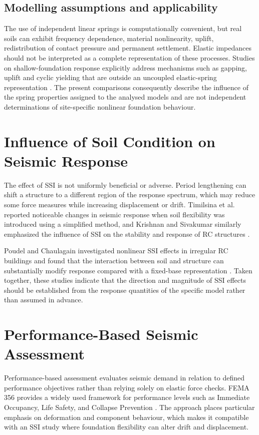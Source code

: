 \subsection*{Modelling assumptions and applicability}
The use of independent linear springs is computationally convenient, but real soils can exhibit frequency dependence, material nonlinearity, uplift, redistribution of contact pressure and permanent settlement. Elastic impedances should not be interpreted as a complete representation of these processes. Studies on shallow-foundation response explicitly address mechanisms such as gapping, uplift and cyclic yielding that are outside an uncoupled elastic-spring representation \cite{gajan2008,raychowdhury2008}. The present comparisons consequently describe the influence of the spring properties assigned to the analysed models and are not independent determinations of site-specific nonlinear foundation behaviour.

\section{Influence of Soil Condition on Seismic Response}
The effect of SSI is not uniformly beneficial or adverse. Period lengthening can shift a structure to a different region of the response spectrum, which may reduce some force measures while increasing displacement or drift. Timilsina et al. reported noticeable changes in seismic response when soil flexibility was introduced using a simplified method, and Krishnan and Sivakumar similarly emphasized the influence of SSI on the stability and response of RC structures \cite{timilsina2023,krishnan2024}.

Poudel and Chaulagain investigated nonlinear SSI effects in irregular RC buildings and found that the interaction between soil and structure can substantially modify response compared with a fixed-base representation \cite{poudel2024}. Taken together, these studies indicate that the direction and magnitude of SSI effects should be established from the response quantities of the specific model rather than assumed in advance.

\section{Performance-Based Seismic Assessment}
Performance-based assessment evaluates seismic demand in relation to defined performance objectives rather than relying solely on elastic force checks. FEMA 356 provides a widely used framework for performance levels such as Immediate Occupancy, Life Safety, and Collapse Prevention \cite{fema356}. The approach places particular emphasis on deformation and component behaviour, which makes it compatible with an SSI study where foundation flexibility can alter drift and displacement.

